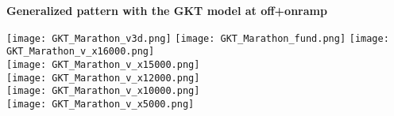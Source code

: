 \documentclass[a4paper,12pt]{scrartcl}
\begin{document}
\begin{center}

{\Large\sf\textbf{Generalized pattern with the GKT model at off+onramp}}


\hspace*{-40mm}
\texttt{[image: GKT\_Marathon\_v3d.png]}
\hspace*{-5mm}
\texttt{[image: GKT\_Marathon\_fund.png]}
\texttt{[image: GKT\_Marathon\_v\_x16000.png]} \\[-2mm]
\texttt{[image: GKT\_Marathon\_v\_x15000.png]} \\[-2mm]
\texttt{[image: GKT\_Marathon\_v\_x12000.png]} \\[-2mm]
\texttt{[image: GKT\_Marathon\_v\_x10000.png]} \\[-2mm]
\texttt{[image: GKT\_Marathon\_v\_x5000.png]}
\end{center}





\end{document}
